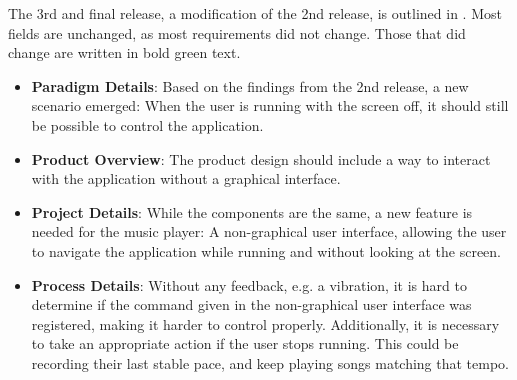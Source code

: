 The 3rd and final release, a modification of the 2nd release, is outlined in . Most fields are unchanged, as most requirements did not change. Those that did change are written in bold green text.



\begin{itemize}
\item \textbf{Paradigm Details}: Based on the findings from the 2nd release, a new scenario emerged: When the user is running with the screen off, it should still be possible to control the application.

\item \textbf{Product Overview}: The product design should include a way to interact with the application without a graphical interface.

\item \textbf{Project Details}: While the components are the same, a new feature is needed for the music player: A non-graphical user interface, allowing the user to navigate the application while running and without looking at the screen.

\item \textbf{Process Details}: Without any  feedback, e.g. a vibration, it is hard to determine if the command given in the non-graphical user interface was registered, making it harder to control properly. \newline
Additionally, it is necessary to take an appropriate action if the user stops running. This could be recording their last stable pace, and keep playing songs matching that tempo.
\end{itemize}